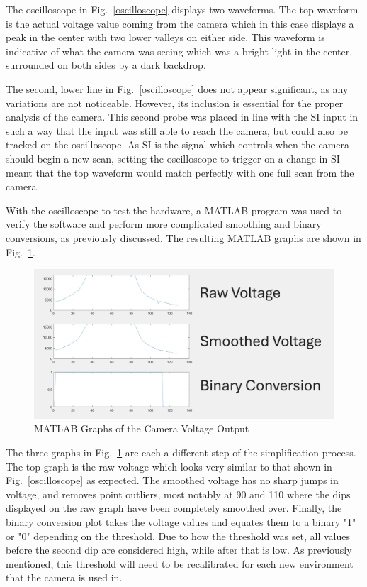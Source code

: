 \documentclass[conference]{IEEEtran}
\begin{document}
The oscilloscope in Fig.~\ref{oscilloscope} displays two waveforms. The top
waveform is the actual voltage value coming from the camera which in this case
displays a peak in the center with two lower valleys on either side. This
waveform is indicative of what the camera was seeing which was a bright light
in the center, surrounded on both sides by a dark backdrop.

The second, lower line in Fig.~\ref{oscilloscope} does not appear significant,
as any variations are not noticeable. However, its inclusion is essential for the
proper analysis of the camera. This second probe was placed in line with the
SI input in such a way that the input was still able to reach the camera, but
could also be tracked on the oscilloscope. As SI is the signal which controls
when the camera should begin a new scan, setting the oscilloscope to trigger
on a change in SI meant that the top waveform would match
perfectly with one full scan from the camera.

With the oscilloscope to test the hardware, a MATLAB program was used to
verify the software and perform more complicated smoothing and binary
conversions, as previously discussed. The resulting MATLAB graphs are shown in
Fig.~\ref{MATLAB}.

\begin{figure}
    \centering
    \includegraphics[width=\linewidth]{images/part3MATLAB.png}
    \caption{MATLAB Graphs of the Camera Voltage Output}
    \label{MATLAB}
\end{figure}

The three graphs in Fig.~\ref{MATLAB} are each a different step of the
simplification process. The top graph is the raw voltage which looks very
similar to that shown in Fig.~\ref{oscilloscope} as expected. 
The smoothed voltage has no sharp
jumps in voltage, and removes point outliers, most notably at 90 and 110 where the dips displayed on the
raw graph have been completely smoothed over. Finally, the binary conversion
plot takes the voltage values and equates them to a binary "1" or "0"
depending on the threshold. Due to how the threshold was set, all values
before the second dip are considered high, while after that is low. As
previously mentioned, this threshold will need to be recalibrated for each %
new environment that the camera is used in.
\end{document}
